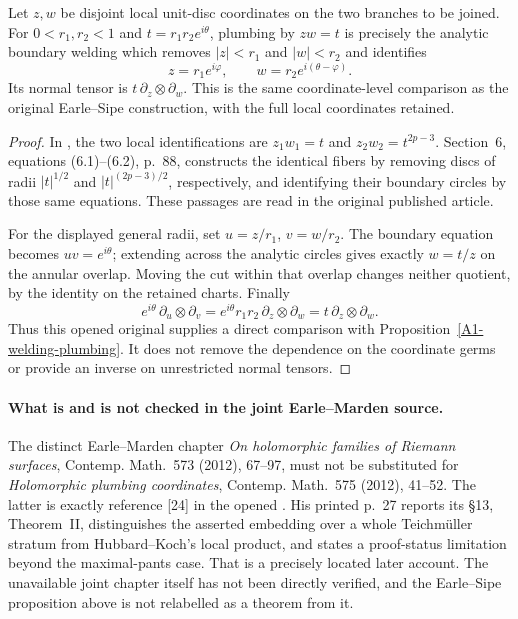 \begin{proposition}\label{A1-Earle-Sipe-comparison}
Let $z,w$ be disjoint local unit-disc coordinates on the two branches to be joined. For $0<r_1,r_2<1$ and $t=r_1r_2e^{i\theta}$, plumbing by $zw=t$ is precisely the analytic boundary welding which removes $|z|<r_1$ and $|w|<r_2$ and identifies
\[
 z=r_1e^{i\varphi},\qquad w=r_2e^{i(\theta-\varphi)}.
\]
Its normal tensor is $t\,\partial_z\otimes\partial_w$. This is the same coordinate-level comparison as the original Earle--Sipe construction, with the full local coordinates retained.
\end{proposition}
\begin{proof}
In \cite[\S2, equations (2.1)--(2.2), pp.~80--82]{EarleSipe1991A567}, the two local identifications are $z_1w_1=t$ and $z_2w_2=t^{2p-3}$. Section~6, equations (6.1)--(6.2), p.~88, constructs the identical fibers by removing discs of radii $|t|^{1/2}$ and $|t|^{(2p-3)/2}$, respectively, and identifying their boundary circles by those same equations. These passages are read in the original published article.

For the displayed general radii, set $u=z/r_1$, $v=w/r_2$. The boundary equation becomes $uv=e^{i\theta}$; extending across the analytic circles gives exactly $w=t/z$ on the annular overlap. Moving the cut within that overlap changes neither quotient, by the identity on the retained charts. Finally
\[
 e^{i\theta}\,\partial_u\otimes\partial_v
 =e^{i\theta}r_1r_2\,\partial_z\otimes\partial_w
 =t\,\partial_z\otimes\partial_w.
\]
Thus this opened original supplies a direct comparison with Proposition~\ref{A1-welding-plumbing}. It does not remove the dependence on the coordinate germs or provide an inverse on unrestricted normal tensors.
\end{proof}

\paragraph{What is and is not checked in the joint Earle--Marden source.}
The distinct Earle--Marden chapter \emph{On holomorphic families of Riemann surfaces}, Contemp. Math.~573 (2012), 67--97, must not be substituted for \emph{Holomorphic plumbing coordinates}, Contemp. Math.~575 (2012), 41--52. The latter is exactly reference [24] in the opened \cite{Matsumoto2019A567}. His printed p.~27 reports its \S13, Theorem~II, distinguishes the asserted embedding over a whole Teichm\"uller stratum from Hubbard--Koch's local product, and states a proof-status limitation beyond the maximal-pants case. That is a precisely located later account. The unavailable joint chapter itself has not been directly verified, and the Earle--Sipe proposition above is not relabelled as a theorem from it.
